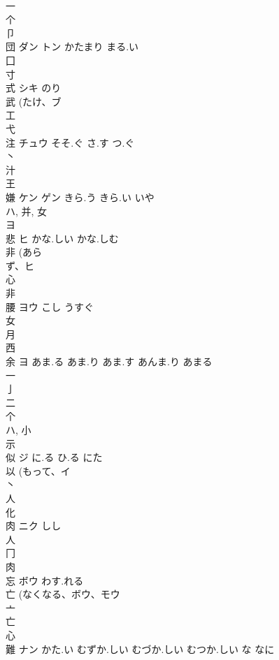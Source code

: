 \documentclass[8pt]{extreport}
\begin{document}
\begin{CJK}{UTF8}{min}
\\	一 
\\	个 
\\	卩 
\\	団	ダン トン	かたまり まる.い	
\\	囗 
\\	寸 
\\	式	シキ	のり	
\\	武 (たけ、ブ 
\\	工 
\\	弋 
\\	注	チュウ	そそ.ぐ さ.す つ.ぐ	
\\	丶 
\\	汁 
\\	王 
\\	嫌	ケン ゲン	きら.う きら.い いや	
\\	ハ, 并, 女 
\\	ヨ	
\\	悲	ヒ	かな.しい かな.しむ	
\\	非 (あら
\\	ず、ヒ 
\\	心 
\\	非 
\\	腰	ヨウ	こし うすぐ	
\\	女 
\\	月 
\\	西 
\\	余	ヨ	あま.る あま.り あま.す あんま.り あまる	
\\	一 
\\	亅 
\\	二 
\\	个 
\\	ハ, 小 
\\	示 
\\	似	ジ	に.る ひ.る にた	
\\	以 (もって、イ 
\\	丶 
\\	人 
\\	化 
\\	肉	ニク	しし	
\\	人 
\\	冂 
\\	肉 
\\	忘	ボウ	わす.れる	
\\	亡 (なくなる、ボウ、モウ 
\\	亠 
\\	亡 
\\	心 
\\	難	ナン	かた.い むずか.しい むづか.しい むつか.しい な なに	

\end{CJK}
\end{document}
